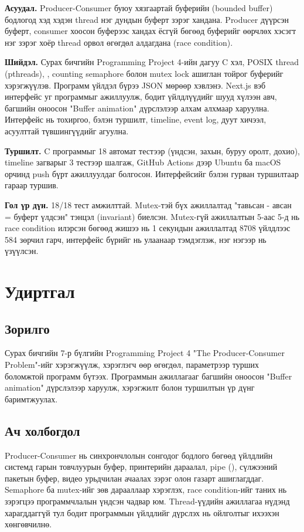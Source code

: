 \documentclass[12pt,a4paper]{article}
\begin{document}
\makecover


\textbf{Асуудал.} Producer-Consumer буюу хязгаартай буферийн (bounded buffer) бодлогод хэд хэдэн thread нэг дундын буферт зэрэг хандана. Producer дүүрсэн буферт, consumer хоосон буферээс хандах ёсгүй бөгөөд буферийг өөрчлөх хэсэгт нэг зэрэг хоёр thread орвол өгөгдөл алдагдана (race condition).

\textbf{Шийдэл.} Сурах бичгийн Programming Project 4-ийн дагуу C хэл, POSIX thread (pthreads), ,  counting semaphore болон mutex lock ашиглан тойрог буферийг хэрэгжүүлэв. Программ үйлдэл бүрээ JSON мөрөөр хэвлэнэ. Next.js вэб интерфейс уг программыг ажиллуулж, бодит үйлдлүүдийг шууд хүлээн авч, багшийн оноосон "Buffer animation" дүрслэлээр алхам алхмаар харуулна. Интерфейс нь тохиргоо, бэлэн туршилт, timeline, event log, дуут хичээл, асуулттай түвшингүүдийг агуулна.

\textbf{Туршилт.} C программыг 18 автомат тестээр (үндсэн, захын, буруу оролт, дохио), timeline загварыг 3 тестээр шалгаж, GitHub Actions дээр Ubuntu ба macOS орчинд push бүрт ажиллуулдаг болгосон. Интерфейсийг бэлэн гурван туршилтаар гараар туршив.

\textbf{Гол үр дүн.} 18/18 тест амжилттай. Mutex-тэй бүх ажиллалтад "тавьсан - авсан = буферт үлдсэн" тэнцэл (invariant) биелсэн. Mutex-гүй ажиллалтын 5-аас 5-д нь race condition илэрсэн бөгөөд жишээ нь 1 секундын ажиллалтад 8708 үйлдлээс 584 зөрчил гарч, интерфейс бүрийг нь улаанаар тэмдэглэж, нэг нэгээр нь үзүүлсэн.

\clearpage
\tableofcontents
\clearpage

\section{Удиртгал}

\subsection{Зорилго}
Сурах бичгийн 7-р бүлгийн Programming Project 4 "The Producer-Consumer Problem"-ийг хэрэгжүүлж, хэрэглэгч өөр өгөгдөл, параметрээр турших боломжтой программ бүтээх. Программын ажиллагааг багшийн оноосон "Buffer animation" дүрслэлээр харуулж, хэрэгжилт болон туршилтын үр дүнг баримтжуулах.

\subsection{Ач холбогдол}
Producer-Consumer нь синхрончлолын сонгодог бодлого бөгөөд үйлдлийн системд гарын товчлуурын буфер, принтерийн дараалал, pipe (), сүлжээний пакетын буфер, видео урьдчилан ачаалах зэрэг олон газарт ашиглагддаг. Semaphore ба mutex-ийг зөв дарааллаар хэрэглэх, race condition-ийг таних нь зэрэгцээ программчлалын үндсэн чадвар юм. Thread-үүдийн ажиллагаа нүдэнд харагддаггүй тул бодит программын үйлдлийг дүрслэх нь ойлголтыг ихээхэн хөнгөвчилнө.
\end{document}
